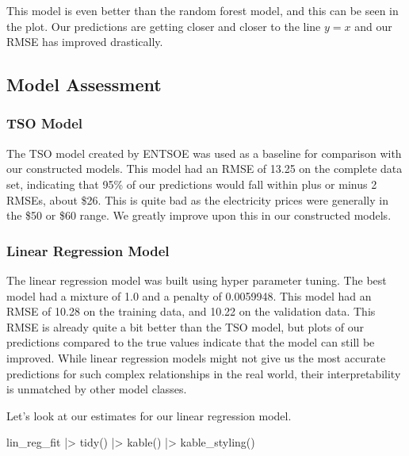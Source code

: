 \documentclass[
]{article}
\newenvironment{Shaded}{\begin{snugshade}}{\end{snugshade}}
\newcommand{\FunctionTok}[1]{\textcolor[rgb]{0.28,0.35,0.67}{#1}}
\newcommand{\NormalTok}[1]{\textcolor[rgb]{0.00,0.23,0.31}{#1}}
\newcommand{\SpecialCharTok}[1]{\textcolor[rgb]{0.37,0.37,0.37}{#1}}
\begin{document}
This model is even better than the random forest model, and this can be
seen in the plot. Our predictions are getting closer and closer to the
line \(y = x\) and our RMSE has improved drastically.

\subsection{Model Assessment}\label{model-assessment}

\subsubsection{TSO Model}\label{tso-model}

The TSO model created by ENTSOE was used as a baseline for comparison
with our constructed models. This model had an RMSE of 13.25 on the
complete data set, indicating that 95\% of our predictions would fall
within plus or minus 2 RMSEs, about \$26. This is quite bad as the
electricity prices were generally in the \$50 or \$60 range. We greatly
improve upon this in our constructed models.

\subsubsection{Linear Regression Model}\label{linear-regression-model-1}

The linear regression model was built using hyper parameter tuning. The
best model had a mixture of 1.0 and a penalty of 0.0059948. This model
had an RMSE of 10.28 on the training data, and 10.22 on the validation
data. This RMSE is already quite a bit better than the TSO model, but
plots of our predictions compared to the true values indicate that the
model can still be improved. While linear regression models might not
give us the most accurate predictions for such complex relationships in
the real world, their interpretability is unmatched by other model
classes.

Let's look at our estimates for our linear regression model.

\begin{Shaded}
\begin{Highlighting}[]
\NormalTok{lin\_reg\_fit }\SpecialCharTok{|\textgreater{}}
  \FunctionTok{tidy}\NormalTok{() }\SpecialCharTok{|\textgreater{}}
  \FunctionTok{kable}\NormalTok{() }\SpecialCharTok{|\textgreater{}}
  \FunctionTok{kable\_styling}\NormalTok{()}
\end{Highlighting}
\end{Shaded}
\end{document}
